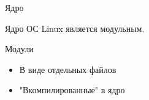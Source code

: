 \begin{frame}{Ядро}

	Ядро ОС Linux является модульным. 

	\begin{block}{Модули}
		\begin{itemize}
			\item В виде отдельных файлов
			\item "Вкомпилированные" в ядро
		\end{itemize}
	\end{block}

	\bigskip
\end{frame}

